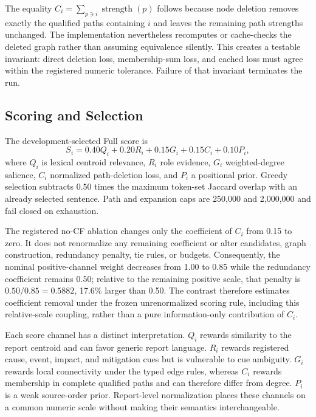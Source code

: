 \documentclass[applsci,article,submit,moreauthors]{Definitions/mdpi}
\begin{document}
The equality $C_i=\sum_{p\ni i}\operatorname{strength}(p)$ follows because node deletion removes exactly the qualified paths containing $i$ and leaves the remaining path strengths unchanged. The implementation nevertheless recomputes or cache-checks the deleted graph rather than assuming equivalence silently. This creates a testable invariant: direct deletion loss, membership-sum loss, and cached loss must agree within the registered numeric tolerance. Failure of that invariant terminates the run.

\subsection{Scoring and Selection}

The development-selected Full score is
\begin{equation}
S_i=0.40Q_i+0.20R_i+0.15G_i+0.15C_i+0.10P_i,
\end{equation}
where $Q_i$ is lexical centroid relevance, $R_i$ role evidence, $G_i$ weighted-degree salience, $C_i$ normalized path-deletion loss, and $P_i$ a positional prior. Greedy selection subtracts $0.50$ times the maximum token-set Jaccard overlap with an already selected sentence. Path and expansion caps are 250,000 and 2,000,000 and fail closed on exhaustion.

The registered no-CF ablation changes only the coefficient of $C_i$ from 0.15 to zero. It does not renormalize any remaining coefficient or alter candidates, graph construction, redundancy penalty, tie rules, or budgets. Consequently, the nominal positive-channel weight decreases from 1.00 to 0.85 while the redundancy coefficient remains 0.50; relative to the remaining positive scale, that penalty is $0.50/0.85=0.5882$, 17.6\% larger than 0.50. The contrast therefore estimates coefficient removal under the frozen unrenormalized scoring rule, including this relative-scale coupling, rather than a pure information-only contribution of $C_i$.

Each score channel has a distinct interpretation. $Q_i$ rewards similarity to the report centroid and can favor generic report language. $R_i$ rewards registered cause, event, impact, and mitigation cues but is vulnerable to cue ambiguity. $G_i$ rewards local connectivity under the typed edge rules, whereas $C_i$ rewards membership in complete qualified paths and can therefore differ from degree. $P_i$ is a weak source-order prior. Report-level normalization places these channels on a common numeric scale without making their semantics interchangeable.
\end{document}
